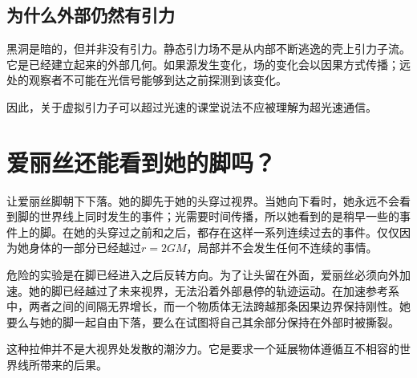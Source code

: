 \subsection{为什么外部仍然有引力}

黑洞是暗的，但并非没有引力。静态引力场不是从内部不断逃逸的壳上引力子流。它是已经建立起来的外部几何。如果源发生变化，场的变化会以因果方式传播；远处的观察者不可能在光信号能够到达之前探测到该变化。

\begin{classroomqa}
\end{classroomqa}

\begin{classroomqa}
\end{classroomqa}

因此，关于虚拟引力子可以超过光速的课堂说法不应被理解为超光速通信。

\section{爱丽丝还能看到她的脚吗？}

让爱丽丝脚朝下下落。她的脚先于她的头穿过视界。当她向下看时，她永远不会看到脚的世界线上同时发生的事件；光需要时间传播，所以她看到的是稍早一些的事件上的脚。在她的头穿过之前和之后，都存在这样一系列连续过去的事件。仅仅因为她身体的一部分已经越过\(r=2GM\)，局部并不会发生任何不连续的事情。

危险的实验是在脚已经进入之后反转方向。为了让头留在外面，爱丽丝必须向外加速。她的脚已经越过了未来视界，无法沿着外部悬停的轨迹运动。在加速参考系中，两者之间的间隔无界增长，而一个物质体无法跨越那条因果边界保持刚性。她要么与她的脚一起自由下落，要么在试图将自己其余部分保持在外部时被撕裂。

这种拉伸并不是大视界处发散的潮汐力。它是要求一个延展物体遵循互不相容的世界线所带来的后果。

